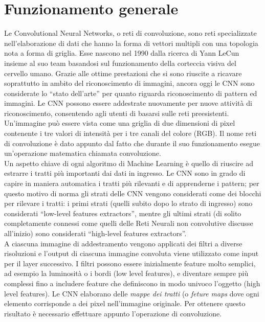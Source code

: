 \section{Funzionamento generale}
Le Convolutional Neural Networks, o reti di convoluzione, sono reti specializzate 
nell'elaborazione di dati che hanno la forma di vettori multipli con una topologia 
nota a forma di griglia. Esse nascono nel 1990 dalla ricerca di Yann LeCun 
insieme al suo team basandosi sul funzionamento della corteccia visiva del
 cervello umano. Grazie alle ottime prestazioni che si sono riuscite a ricavare 
 soprattutto in ambito del riconoscimento di immagini, ancora oggi le
CNN sono considerate lo “stato dell’arte” per quanto riguarda riconoscimento di
 pattern ed immagini.  Le CNN possono essere addestrate nuovamente per nuove attività di riconoscimento, 
 consentendo agli utenti di basarsi sulle reti preesistenti.\\
Un’immagine può essere vista come una griglia di due dimensioni di pixel 
contenente i tre valori di intensità per i tre canali del colore (RGB). 
Il nome reti di convoluzione è dato appunto dal fatto che durante il suo 
funzionamento esegue un’operazione matematica chiamata convoluzione. \\
Un aspetto chiave di ogni algoritmo di Machine Learning è quello di riuscire
 ad estrarre i tratti più importanti dai dati in ingresso. Le CNN sono 
 in grado di capire in maniera automatica i tratti più rilevanti e di apprenderne 
 i pattern; per questo motivo di norma gli strati delle CNN vengono considerati 
 come dei blocchi per rilevare i tratti: i primi strati (quelli subito dopo lo
  strato di ingresso) sono considerati “low-level features extractors”, mentre
   gli ultimi strati (di solito completamente connessi come quelli delle Reti 
   Neurali non convolutive discusse all’inizio) sono considerati 
   “high-level features extractors”. \\
   A ciascuna immagine di addestramento vengono applicati dei filtri 
   a diverse risoluzioni e l’output di ciascuna immagine convoluta viene utilizzato 
   come input per il layer successivo. I filtri possono essere inizialmente feature 
   molto semplici, ad esempio la luminosità o i bordi (low level features), e diventare sempre più
    complessi fino a includere feature che definiscono in modo univoco l’oggetto (high level features).
   Le CNN elaborano delle \emph{mappe dei tratti} (o \emph{feture maps} dove ogni elemento corrisponde
    a dei pixel nell’immagine originale. Per ottenere questo risultato è necessario
     effettuare appunto l’operazione di convoluzione.\\
    
